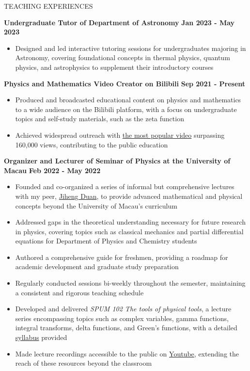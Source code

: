 \documentclass[10pt]{article} %
\begin{document}
\begin{section}{TEACHING EXPERIENCES}

\textbf{Undergraduate Tutor of Department of Astronomy} \hfill \textbf{Jan 2023 - May 2023}
\begin{itemize}[leftmargin=1.5em]
    \item Designed and led interactive tutoring sessions for undergraduates majoring in Astronomy, covering foundational concepts in thermal physics, quantum physics, and astrophysics to supplement their introductory courses
\end{itemize}

\textbf{Physics and Mathematics Video Creator on Bilibili} \hfill \textbf{Sep 2021 - Present}
\begin{itemize}[leftmargin=1.5em]
    \item Produced and broadcasted  educational content on physics and mathematics to a wide audience on the Bilibili platform, with a focus on undergraduate topics and self-study materials, such as the zeta function
    \item Achieved widespread outreach with \href{https://www.bilibili.com/video/BV1th411W7xu/}{the most popular video} surpassing 160,000 views, contributing to the public education
\end{itemize}

\textbf{Organizer and Lecturer of Seminar of Physics at the University of Macau} \hfill \textbf{Feb 2022 - May 2022}
\begin{itemize}[leftmargin=1.5em]
    \item Founded and co-organized a series of informal but comprehensive lectures with my peer, \href{http://runawayfancy.me/}{Jiheng Duan}, to provide advanced mathematical and physical concepts beyond the University of Macau's curriculum
    \item Addressed gaps in the theoretical understanding necessary for future research in physics, covering topics such as classical mechanics and partial differential equations for Department of Physics and Chemistry students
    \item Authored a comprehensive guide for freshmen, providing a roadmap for academic development and graduate study preparation
    \item Regularly conducted sessions bi-weekly throughout the semester, maintaining a consistent and rigorous teaching schedule
    \item Developed and delivered \textit{SPUM 102 The tools of physical tools}, a lecture series encompassing topics such as complex variables, gamma functions, integral transforms, delta functions, and Green's functions, with a detailed \href{https://github.com/Chisen-Lupus/Seminar-of-Physics-UM/blob/main/SPUM%20102%20The%20tools%20of%20physical%20tool.pdf}{syllabus} provided
    \item Made lecture recordings accessible to the public on \href{https://www.youtube.com/watch?v=nQkv03r-XeQ&list=PLV9fHDZW7hHWQ9rrAk7c9kdeV-Lqyt7pV&index=10}{Youtube}, extending the reach of these resources beyond the classroom
\end{itemize}

\end{section}
\end{document}
